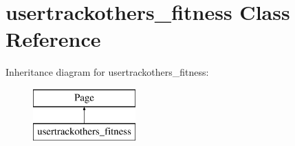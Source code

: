 \hypertarget{classusertrackothers__fitness}{\section{usertrackothers\-\_\-fitness Class Reference}
\label{classusertrackothers__fitness}
}
Inheritance diagram for usertrackothers\-\_\-fitness\-:\begin{figure}[H]
\begin{center}
\leavevmode
\includegraphics[height=2.000000cm]{classusertrackothers__fitness}
\end{center}
\end{figure}
